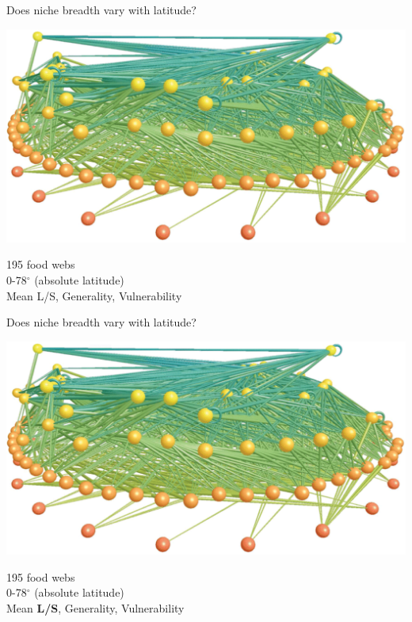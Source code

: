 \documentclass{beamer}
\begin{document}
  \begin{frame}{Does niche breadth vary with latitude?}

    \begin{center}
      \includegraphics*[width=.8\textwidth]{Figures/LittleRockLake.eps}


    195 food webs \\
    0-78$^\circ$ (absolute latitude) \\
    Mean L/S, Generality, Vulnerability

    \end{center}

  \end{frame}


  \begin{frame}{Does niche breadth vary with latitude?}

    \begin{center}
      \includegraphics*[width=.8\textwidth]{Figures/LittleRockLake.eps}


    195 food webs \\
    0-78$^\circ$ (absolute latitude) \\
    Mean \textbf{L/S}, Generality, Vulnerability

    \end{center}

  \end{frame}
\end{document}
